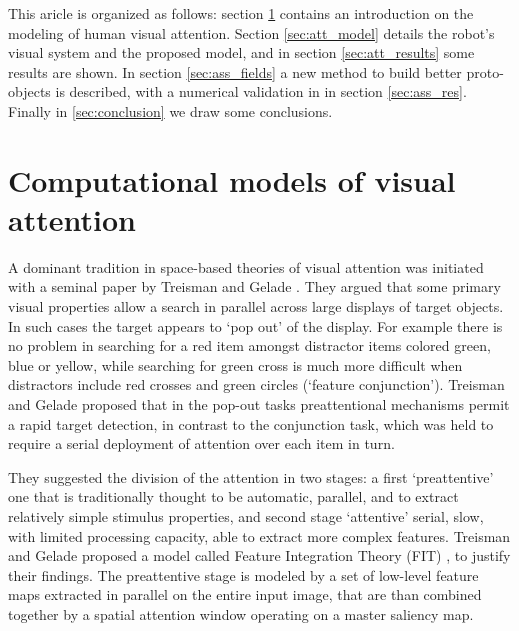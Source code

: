 \documentclass{llncs}
\begin{document}

This aricle is organized as follows:
section \ref{sec:att_comp_models} contains an introduction on the modeling of
human visual attention. Section \ref{sec:att_model}
details the robot's visual system and the
proposed model, and in section \ref{sec:att_results} some results are shown.
In section \ref{sec:ass_fields} a new method to build better proto-objects is described,
with a numerical validation in in section \ref{sec:ass_res}. Finally in \ref{sec:conclusion}
we draw some conclusions.


\section{Computational models of visual attention}
\label{sec:att_comp_models}

A dominant tradition in space-based theories of visual attention was initiated
with a seminal paper by Treisman and Gelade \cite{TreismanG80}. They argued
that some primary visual properties allow a search in parallel across large
displays of target objects. In such cases the target appears to `pop out' of
the display. For example there is no problem in searching for a red item
amongst distractor items colored green, blue or yellow, while searching for
green cross is much more difficult when distractors include red crosses and
green circles (`feature conjunction').
Treisman and Gelade proposed that in the pop-out tasks preattentional mechanisms
permit a rapid target detection, in contrast to the conjunction task, which was held
to require a serial deployment of attention over each item in turn.

They suggested the division of the attention in two stages: a first `preattentive' one that is traditionally thought to be
automatic, parallel, and to extract relatively simple stimulus properties, and second stage
`attentive' serial, slow, with limited processing capacity, able to extract more complex features.
Treisman and Gelade proposed a model called Feature Integration Theory (FIT) \cite{TreismanG80},
to justify their findings. The preattentive stage is
modeled by a set of low-level feature maps extracted
in parallel on the entire input image, that are than combined
together by a spatial attention window operating on a
master saliency map.
\end{document}
